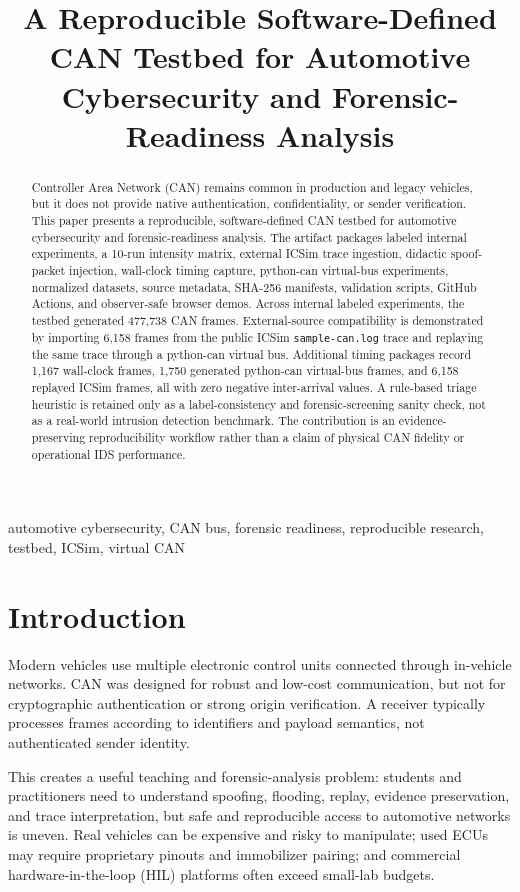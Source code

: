 \documentclass[conference]{IEEEtran}
\title{A Reproducible Software-Defined CAN Testbed for Automotive Cybersecurity and Forensic-Readiness Analysis}
\author{\IEEEauthorblockN{Osvaldo Janeri Filho}
\IEEEauthorblockA{Independent Researcher / Digital Forensics Practitioner\\
Fortaleza, Cear\'{a}, Brazil\\
Email omitted for blind or camera-ready submission}}
\begin{document}
\maketitle

\begin{abstract}
Controller Area Network (CAN) remains common in production and legacy vehicles, but it does not provide native authentication, confidentiality, or sender verification. This paper presents a reproducible, software-defined CAN testbed for automotive cybersecurity and forensic-readiness analysis. The artifact packages labeled internal experiments, a 10-run intensity matrix, external ICSim trace ingestion, didactic spoof-packet injection, wall-clock timing capture, python-can virtual-bus experiments, normalized datasets, source metadata, SHA-256 manifests, validation scripts, GitHub Actions, and observer-safe browser demos. Across internal labeled experiments, the testbed generated 477,738 CAN frames. External-source compatibility is demonstrated by importing 6,158 frames from the public ICSim \texttt{sample-can.log} trace and replaying the same trace through a python-can virtual bus. Additional timing packages record 1,167 wall-clock frames, 1,750 generated python-can virtual-bus frames, and 6,158 replayed ICSim frames, all with zero negative inter-arrival values. A rule-based triage heuristic is retained only as a label-consistency and forensic-screening sanity check, not as a real-world intrusion detection benchmark. The contribution is an evidence-preserving reproducibility workflow rather than a claim of physical CAN fidelity or operational IDS performance.
\end{abstract}

\begin{IEEEkeywords}
automotive cybersecurity, CAN bus, forensic readiness, reproducible research, testbed, ICSim, virtual CAN
\end{IEEEkeywords}

\section{Introduction}
Modern vehicles use multiple electronic control units connected through in-vehicle networks. CAN was designed for robust and low-cost communication, but not for cryptographic authentication or strong origin verification. A receiver typically processes frames according to identifiers and payload semantics, not authenticated sender identity.

This creates a useful teaching and forensic-analysis problem: students and practitioners need to understand spoofing, flooding, replay, evidence preservation, and trace interpretation, but safe and reproducible access to automotive networks is uneven. Real vehicles can be expensive and risky to manipulate; used ECUs may require proprietary pinouts and immobilizer pairing; and commercial hardware-in-the-loop (HIL) platforms often exceed small-lab budgets.
\end{document}
